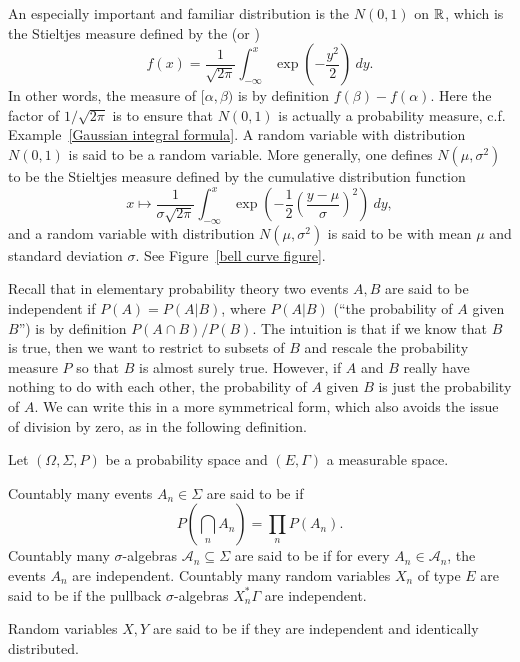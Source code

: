\begin{example}\label{Gaussian CDF}
An especially important and familiar distribution is the  $N(0, 1)$ on $\mathbb{R}$, which is the Stieltjes measure defined by the  (or )
\[f(x) = \frac{1}{\sqrt{2\pi}} \int_{-\infty}^{x} \exp\left(-\frac{y^{2}}{2}\right) ~dy.\]
In other words, the measure of $[\alpha, \beta)$ is by definition $f(\beta) - f(\alpha)$.
Here the factor of $1/\sqrt{2\pi}$ is to ensure that $N(0, 1)$ is actually a probability measure, c.f. Example~\ref{Gaussian integral formula}.
A random variable with distribution $N(0, 1)$ is said to be a  random variable. More generally, one defines $N(\mu, \sigma^{2})$ to be the Stieltjes measure defined by the cumulative distribution function
\[x \mapsto \frac{1}{\sigma\sqrt{2\pi}} \int_{-\infty}^{x} \exp\left(-\frac{1}{2}{\left(\frac{y - \mu}{\sigma}\right)}^{2}\right) ~dy,\]
and a random variable with distribution $N(\mu, \sigma^{2})$ is said to be  with mean $\mu$ and standard deviation $\sigma$.
See Figure~\ref{bell curve figure}.
\end{example}

\begin{subsec}
Recall that in elementary probability theory two events $A,B$ are said to be independent if $P(A) = P(A|B)$, where $P(A|B)$ (``the probability of $A$ given $B$'') is by definition $P(A \cap B)/P(B)$.
The intuition is that if we know that $B$ is true, then we want to restrict to subsets of $B$ and rescale the probability measure $P$ so that $B$ is almost surely true.
However, if $A$ and $B$ really have nothing to do with each other, the probability of $A$ given $B$ is just the probability of $A$.
We can write this in a more symmetrical form, which also avoids the issue of division by zero, as in the following definition.
\end{subsec}

\begin{definition}
Let $(\Omega, \Sigma, P)$ be a probability space and $(E, \Gamma)$ a measurable space.

Countably many events $A_{n} \in \Sigma$ are said to be  if
\[P\left(\bigcap_{n} A_{n}\right) = \prod_{n} P(A_{n}).\]
Countably many $\sigma$-algebras $\mathcal A_{n} \subseteq \Sigma$ are said to be  if for every $A_{n} \in \mathcal A_{n}$, the events $A_{n}$ are independent.
Countably many random variables $X_{n}$ of type $E$ are said to be  if the pullback $\sigma$-algebras $X_{n}^{*}\Gamma$ are independent.

Random variables $X,Y$ are said to be  if they are independent and identically distributed.
\end{definition}


